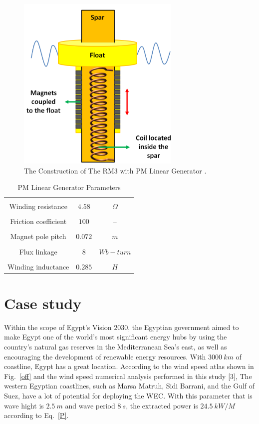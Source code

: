 \documentclass[conference]{IEEEtran}
\begin{document}
\begin{figure}[htbp]
	\centerline{\includegraphics[width=1.6 in]{fig/4.png}}
	\caption{The Construction of The RM3 with PM Linear Generator \cite{lawson2014development}.}
	\label{rm3lin}
\end{figure}
\begin{table}[htbp]
	\caption{PM Linear Generator Parameters}
	\begin{center}
			\begin{tabular}{|c|c|c|}
				\hline
				\hline
				\\[-1em]
				Winding resistance&	$4.58$	&$\Omega$ \\
				\hline
				\\[-1em]
				Friction coefficient&	$100$&	--  \\
				\hline
				\\[-1em]
				Magnet pole pitch&	$0.072$&	$m$\\
				\hline
				\\[-1em]
				Flux linkage&	$8$	&$Wb-turn$\\
				\hline
				\\[-1em]
				Winding inductance&	$0.285$	&$H$\\
				\hline
				\hline
			\end{tabular}
		\label{tab1}
	\end{center}
\end{table}
\section{Case study}
Within the scope of Egypt's Vision $2030$, the Egyptian government aimed to make Egypt one of the world's most significant energy hubs by using the country's natural gas reserves in the Mediterranean Sea's east, as well as encouraging the development of renewable energy resources. With $3000\ km$ of coastline, Egypt has a great location. According to the wind speed atlas shown in Fig.~\ref{off} \cite{mortensen2006wind} and the wind speed numerical analysis performed in this study [3], The western Egyptian coastlines, such as Marsa Matruh, Sidi Barrani, and the Gulf of Suez, have a lot of potential for deploying the WEC. With this parameter that is wave hight is $2.5\ m$ and wave period $8\ s$, the extracted power is $24.5\ kW/M$ according to Eq.~\ref{P}.
\end{document}
